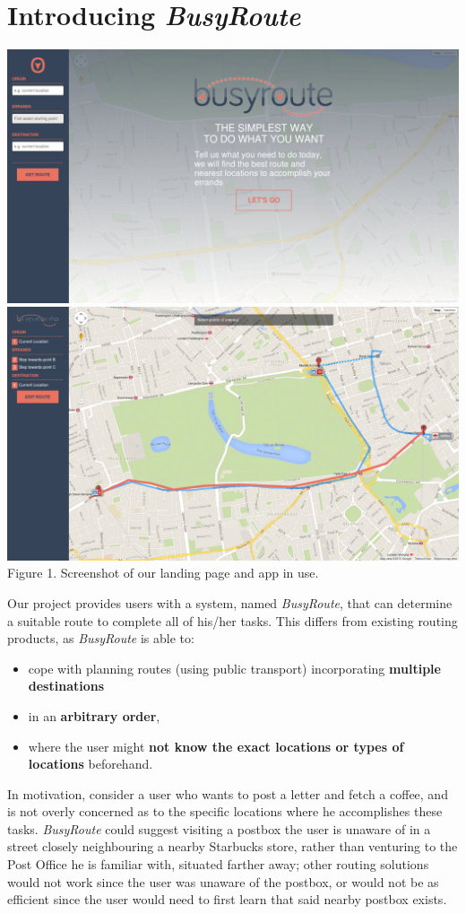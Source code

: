 \documentclass[a4paper, 10pt]{report}
\begin{document}
\section{Introducing \textit{BusyRoute}}
\begin{center}
\includegraphics[scale=.13]{busyroute_landing.png}
\includegraphics[scale=.13]{busyroute_route1.png}\\
Figure 1. Screenshot of our landing page and app in use.
\end{center}
Our project provides users with a system, named \textit{BusyRoute}, that can determine a suitable route to complete all of his/her tasks. This differs from existing routing products, as \textit{BusyRoute} is able to:
\begin{itemize}
\item cope with planning routes (using public transport) incorporating \textbf{multiple destinations}
\item in an \textbf{arbitrary order},
\item where the user might \textbf{not know the exact locations or types of locations} beforehand.
\end{itemize}
In motivation, consider a user who wants to post a letter and fetch a coffee, and is not overly concerned as to the specific locations where he accomplishes these tasks. \textit{BusyRoute} could suggest visiting a postbox the user is unaware of in a street closely neighbouring a nearby Starbucks store, rather than venturing to the Post Office he is familiar with, situated farther away; other routing solutions would not work since the user was unaware of the postbox, or would not be as efficient since the user would need to first learn that said nearby postbox exists.
\end{document}
